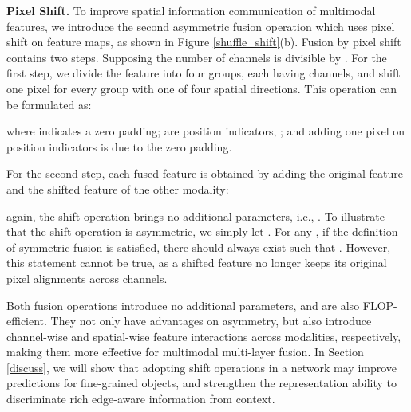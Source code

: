 \documentclass[sigconf]{acmart}
\begin{document}
\textbf{Pixel Shift.}\label{sec:pixel_shift} 
To improve spatial information communication of multimodal features, we introduce the second asymmetric fusion operation which uses pixel shift on feature maps, as shown in Figure \ref{shuffle_shift}(b). Fusion by pixel shift contains two steps. Supposing the number of channels  is divisible by . For the first step, we divide the feature into four groups, each having  channels, and shift one pixel for every group with one of four spatial directions. This operation can be formulated as:

where  indicates a zero padding;  are position indicators, ; and adding one pixel on position indicators is due to the zero padding.

For the second step, each fused feature is obtained by adding the original feature and the shifted feature of the other modality:

again, the shift operation brings no additional parameters, i.e., . To illustrate that the shift operation is asymmetric, we simply let . For any , if the definition of symmetric fusion is satisfied, there should always exist  such that . However, this statement cannot be true, as a shifted feature no longer keeps its original pixel alignments across channels.

Both fusion operations introduce no additional parameters, and are also FLOP-efficient. They not only have advantages on asymmetry, but also introduce channel-wise and spatial-wise feature interactions across modalities, respectively, making them more effective for multimodal multi-layer fusion. In Section \ref{discuss}, we will show that adopting shift operations in a network may improve predictions for fine-grained objects,  and strengthen the representation ability to discriminate rich edge-aware information from context.
\end{document}
